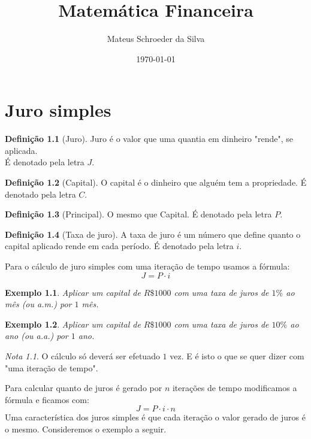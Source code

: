 \documentclass{book}
\title{Matemática Financeira}
\author{Mateus Schroeder da Silva}
\date{\today}
\theoremstyle{definition}
\newtheorem{definition}{Definição}
\theoremstyle{remark}
\newtheorem*{remark}{Nota}
\theoremstyle{plain}
\theoremstyle{plain}
\theoremstyle{plain}
\theoremstyle{plain}
\newtheorem{example}{Exemplo}
\begin{document}
    \maketitle
    \chapter{Juro simples}
    \begin{definition}[Juro]
        Juro é o valor que uma quantia em dinheiro "rende", se aplicada. \\
        É denotado pela letra $J$.
    \end{definition}
    \begin{definition}[Capital]
        O capital é o dinheiro que alguém tem a propriedade.
        É denotado pela letra $C$.
    \end{definition}
    \begin{definition}[Principal]
        O mesmo que Capital.
        É denotado pela letra $P$.
    \end{definition}
    \begin{definition}[Taxa de juro]
        A taxa de juro é um número que define quanto o capital aplicado rende em cada período.
        É denotado pela letra $i$.
    \end{definition}
    Para o cálculo de juro simples com uma iteração de tempo usamos a fórmula:
    $$J = P \cdot i$$
    \begin{example}
        Aplicar um capital de $R\$ \num{1000} $ com uma taxa de juros de $1\%$ ao mês (ou a.m.) por $1$ mês.
    \end{example}
    \begin{example}
        Aplicar um capital de $R\$ \num{1000} $ com uma taxa de juros de $10\%$ ao ano (ou a.a.) por $1$ ano.
    \end{example}
    \begin{remark}
        O cálculo só deverá ser efetuado $1$ vez. E é isto o que se quer dizer com "uma iteração de tempo".
    \end{remark}
    
    Para calcular quanto de juros é gerado por $n$ iterações 
    de tempo modificamos a fórmula e ficamos com:
    $$J = P \cdot i \cdot n$$
    Uma característica dos juros simples é que cada iteração o valor gerado de juros é o mesmo. 
    Consideremos o exemplo a seguir.
\end{document}
